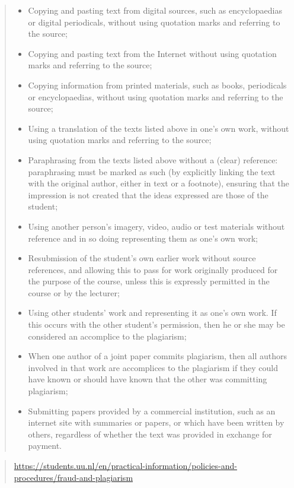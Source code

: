 \documentclass[
]{book}
\providecommand{\tightlist}{%
  \setlength{\itemsep}{0pt}\setlength{\parskip}{0pt}}
\begin{document}
\begin{quote}
\begin{itemize}
\tightlist
\item
  Copying and pasting text from digital sources, such as encyclopaedias or digital periodicals, without using quotation marks and referring to the source;
\item
  Copying and pasting text from the Internet without using quotation marks and referring to the source;
\item
  Copying information from printed materials, such as books, periodicals or encyclopaedias, without using quotation marks and referring to the source;
\item
  Using a translation of the texts listed above in one's own work, without using quotation marks and referring to the source;
\item
  Paraphrasing from the texts listed above without a (clear) reference: paraphrasing must be marked as such (by explicitly linking the text with the original author, either in text or a footnote), ensuring that the impression is not created that the ideas expressed are those of the student;
\item
  Using another person's imagery, video, audio or test materials without reference and in so doing representing them as one's own work;
\item
  Resubmission of the student's own earlier work without source references, and allowing this to pass for work originally produced for the purpose of the course, unless this is expressly permitted in the course or by the lecturer;
\item
  Using other students' work and representing it as one's own work. If this occurs with the other student's permission, then he or she may be considered an accomplice to the plagiarism;
\item
  When one author of a joint paper commits plagiarism, then all authors involved in that work are accomplices to the plagiarism if they could have known or should have known that the other was committing plagiarism;
\item
  Submitting papers provided by a commercial institution, such as an internet site with summaries or papers, or which have been written by others, regardless of whether the text was provided in exchange for payment.
\end{itemize}
\end{quote}

\begin{quote}
\url{https://students.uu.nl/en/practical-information/policies-and-procedures/fraud-and-plagiarism}
\end{quote}
\end{document}
